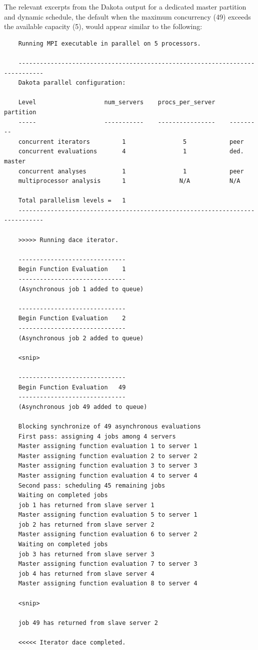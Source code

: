 The relevant excerpts from the Dakota output for a dedicated master
partition and dynamic schedule, the default when the maximum concurrency
(49) exceeds the available capacity (5), would appear similar to the
following:
\begin{small}
\begin{verbatim}
    Running MPI executable in parallel on 5 processors.

    -----------------------------------------------------------------------------
    Dakota parallel configuration:

    Level                   num_servers    procs_per_server    partition
    -----                   -----------    ----------------    ---------
    concurrent iterators         1                5            peer
    concurrent evaluations       4                1            ded. master
    concurrent analyses          1                1            peer
    multiprocessor analysis      1               N/A           N/A

    Total parallelism levels =   1
    -----------------------------------------------------------------------------

    >>>>> Running dace iterator.

    ------------------------------
    Begin Function Evaluation    1
    ------------------------------
    (Asynchronous job 1 added to queue)

    ------------------------------
    Begin Function Evaluation    2
    ------------------------------
    (Asynchronous job 2 added to queue)

    <snip>

    ------------------------------
    Begin Function Evaluation   49
    ------------------------------
    (Asynchronous job 49 added to queue)

    Blocking synchronize of 49 asynchronous evaluations
    First pass: assigning 4 jobs among 4 servers
    Master assigning function evaluation 1 to server 1
    Master assigning function evaluation 2 to server 2
    Master assigning function evaluation 3 to server 3
    Master assigning function evaluation 4 to server 4
    Second pass: scheduling 45 remaining jobs
    Waiting on completed jobs
    job 1 has returned from slave server 1
    Master assigning function evaluation 5 to server 1
    job 2 has returned from slave server 2
    Master assigning function evaluation 6 to server 2
    Waiting on completed jobs
    job 3 has returned from slave server 3
    Master assigning function evaluation 7 to server 3
    job 4 has returned from slave server 4
    Master assigning function evaluation 8 to server 4

    <snip>

    job 49 has returned from slave server 2

    <<<<< Iterator dace completed.
\end{verbatim}
\end{small}
